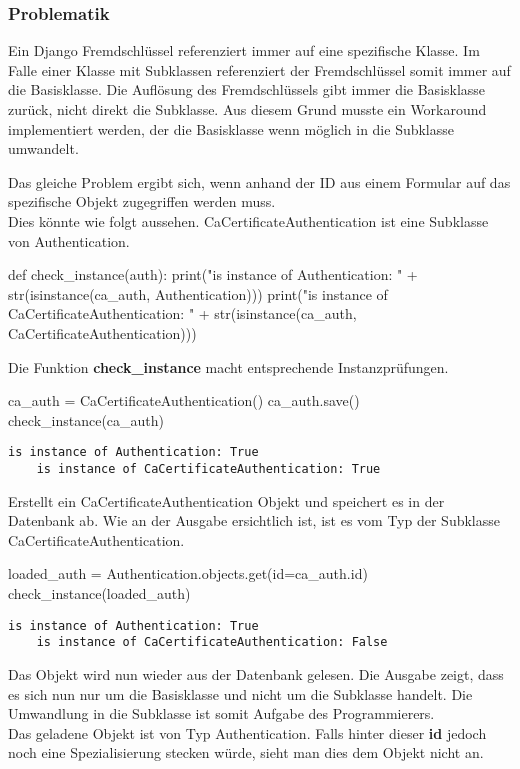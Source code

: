 \subsubsection{Problematik}
Ein Django Fremdschlüssel referenziert immer auf eine spezifische Klasse. Im Falle einer Klasse mit Subklassen referenziert der Fremdschlüssel somit immer auf die Basisklasse. Die Auflösung des Fremdschlüssels gibt immer die Basisklasse zurück, nicht direkt die Subklasse. Aus diesem Grund musste ein Workaround implementiert werden, der die Basisklasse wenn möglich in die Subklasse umwandelt.

Das gleiche Problem ergibt sich, wenn anhand der ID aus einem Formular auf das spezifische Objekt zugegriffen werden muss.
\\
Dies könnte wie folgt aussehen. CaCertificateAuthentication ist eine Subklasse von Authentication.
\medskip
\begin{python}
    def check_instance(auth):
        print("is instance of Authentication: " + 
            str(isinstance(ca_auth, Authentication)))
        print("is instance of CaCertificateAuthentication: " + 
            str(isinstance(ca_auth, CaCertificateAuthentication)))
\end{python}
Die Funktion \textbf{check\_instance} macht entsprechende Instanzprüfungen.\\

\begin{python}
    ca_auth = CaCertificateAuthentication()
    ca_auth.save()
    check_instance(ca_auth)
\end{python}

\begin{lstlisting}[style=BashInputStyle]
    is instance of Authentication: True
    is instance of CaCertificateAuthentication: True
\end{lstlisting}    
Erstellt ein  CaCertificateAuthentication Objekt und speichert es in der Datenbank ab. Wie an der Ausgabe ersichtlich ist, ist es vom Typ der Subklasse CaCertificateAuthentication.\\

\begin{python}
    loaded_auth = Authentication.objects.get(id=ca_auth.id)
    check_instance(loaded_auth)
\end{python}
\begin{lstlisting}[style=BashInputStyle]
    is instance of Authentication: True
    is instance of CaCertificateAuthentication: False
\end{lstlisting} 
Das Objekt wird nun wieder aus der Datenbank gelesen. Die Ausgabe zeigt, dass es sich nun nur um die Basisklasse und nicht um die Subklasse handelt. Die Umwandlung in die Subklasse ist somit Aufgabe des Programmierers.\\
Das geladene Objekt ist von Typ Authentication. Falls hinter dieser \textbf{id} jedoch noch eine Spezialisierung stecken würde, sieht man dies dem Objekt nicht an.


